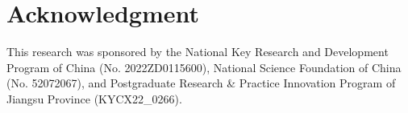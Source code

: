 \documentclass[journal]{IEEEtran}
\begin{document}


\section*{Acknowledgment}

This research was sponsored by the National Key Research and Development Program of China (No. 2022ZD0115600),
National Science Foundation of China (No. 52072067), and Postgraduate Research \& Practice Innovation Program of Jiangsu Province (KYCX22\_0266).

% 
% 




\end{document}
